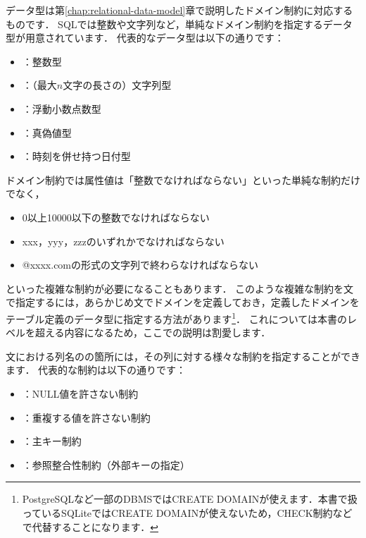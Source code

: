 データ型は第\ref{chap:relational-data-model}章で説明したドメイン制約に対応するものです．
SQLでは整数や文字列など，単純なドメイン制約を指定するデータ型が用意されています．
代表的なデータ型は以下の通りです：
\begin{itemize}
\item {}：整数型
\item {}：（最大$n$文字の長さの）文字列型
\item {}：浮動小数点数型
\item {}：真偽値型
\item {}：時刻を併せ持つ日付型
\end{itemize}
ドメイン制約では属性値は「整数でなければならない」といった単純な制約だけでなく，
\begin{itemize}
\item 0以上10000以下の整数でなければならない
\item xxx，yyy，zzzのいずれかでなければならない
\item @xxxx.comの形式の文字列で終わらなければならない
\end{itemize}
といった複雑な制約が必要になることもあります．
このような複雑な制約を文で指定するには，あらかじめ文でドメインを定義しておき，定義したドメインをテーブル定義のデータ型に指定する方法があります\footnote{PostgreSQLなど一部のDBMSではCREATE DOMAINが使えます．本書で扱っているSQLiteではCREATE DOMAINが使えないため，CHECK制約などで代替することになります．}．
これについては本書のレベルを超える内容になるため，ここでの説明は割愛します．

文における列名の\graybox{[制約]}の箇所には，その列に対する様々な制約を指定することができます．
代表的な制約は以下の通りです：
\begin{itemize}
\item {}：NULL値を許さない制約
\item {}：重複する値を許さない制約
\item {}：主キー制約
\item {}：参照整合性制約（外部キーの指定）
\end{itemize}

